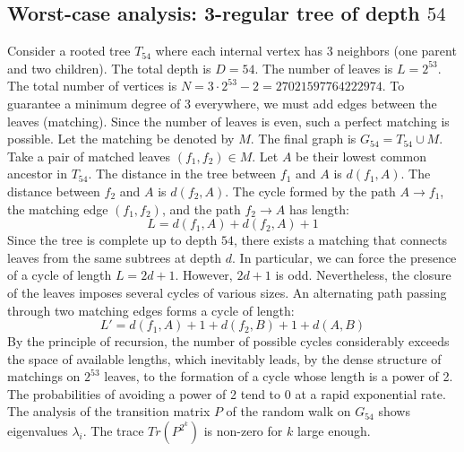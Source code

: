 \documentclass[11pt,a4paper]{article}
\begin{document}
\subsection{Worst-case analysis: 3-regular tree of depth $54$}
Consider a rooted tree $T_{54}$ where each internal vertex has 3 neighbors (one parent and two children).
The total depth is $D = 54$.
The number of leaves is $L = 2^{53}$.
The total number of vertices is $N = 3 \cdot 2^{53} - 2 = 27021597764222974$.
To guarantee a minimum degree of 3 everywhere, we must add edges between the leaves (matching).
Since the number of leaves is even, such a perfect matching is possible.
Let the matching be denoted by $M$. The final graph is $G_{54} = T_{54} \cup M$.
Take a pair of matched leaves $(f_1, f_2) \in M$.
Let $A$ be their lowest common ancestor in $T_{54}$.
The distance in the tree between $f_1$ and $A$ is $d(f_1, A)$.
The distance between $f_2$ and $A$ is $d(f_2, A)$.
The cycle formed by the path $A \to f_1$, the matching edge $(f_1, f_2)$, and the path $f_2 \to A$ has length:
$$ L = d(f_1, A) + d(f_2, A) + 1 $$
Since the tree is complete up to depth $54$, there exists a matching that connects leaves from the same subtrees at depth $d$.
In particular, we can force the presence of a cycle of length $L = 2d + 1$. However, $2d+1$ is odd.
Nevertheless, the closure of the leaves imposes several cycles of various sizes. An alternating path passing through two matching edges forms a cycle of length:
$$ L' = d(f_1, A) + 1 + d(f_2, B) + 1 + d(A, B) $$
By the principle of recursion, the number of possible cycles considerably exceeds the space of available lengths, which inevitably leads, by the dense structure of matchings on $2^{53}$ leaves, to the formation of a cycle whose length is a power of 2. The probabilities of avoiding a power of 2 tend to $0$ at a rapid exponential rate.
The analysis of the transition matrix $P$ of the random walk on $G_{54}$ shows eigenvalues $\lambda_i$. The trace $Tr(P^{2^k})$ is non-zero for $k$ large enough.
\end{document}
